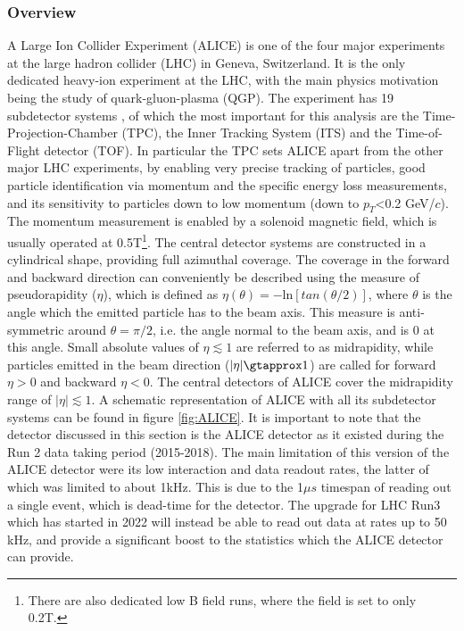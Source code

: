 \subsubsection{Overview}
A Large Ion Collider Experiment (ALICE) is one of the four major experiments at the large hadron collider (LHC) in Geneva, Switzerland. It is the only dedicated heavy-ion experiment at the LHC, with the main physics motivation being the study of quark-gluon-plasma (QGP). The experiment has 19 subdetector systems \cite{}, of which the most important for this analysis are the Time-Projection-Chamber (TPC), the Inner Tracking System (ITS) and the Time-of-Flight detector (TOF). In particular the TPC sets ALICE apart from the other major LHC experiments, by enabling very precise tracking of particles, good particle identification via momentum and the specific energy loss measurements, and its sensitivity to particles down to low momentum (down to $p_T$<0.2 GeV/$c$). The momentum measurement is enabled by a solenoid magnetic field, which is usually operated at 0.5T\footnote{There are also dedicated low B field runs, where the field is set to only 0.2T.}. The central detector systems are constructed in a cylindrical shape, providing full azimuthal coverage. The coverage in the forward and backward direction can conveniently be described using the measure of pseudorapidity ($\eta$), which is defined as $\eta (\theta) = -\mathrm{ln}[tan(\theta/2)]$, where $\theta$ is the angle which the emitted particle has to the beam axis. This measure is anti-symmetric around $\theta = \pi/2$, i.e. the angle normal to the beam axis, and is 0 at this angle. Small absolute values of $\eta \lesssim 1$ are referred to as midrapidity, while particles emitted in the beam direction ($|\eta|\gtapprox 1$) are called for forward $\eta >0$ and backward $\eta < 0$. The central detectors of ALICE cover the midrapidity range of $|\eta|\lesssim 1$. A schematic representation of ALICE with all its subdetector systems can be found in figure \ref{fig:ALICE}. It is important to note that the detector discussed in this section is the ALICE detector as it existed during the Run 2 data taking period (2015-2018). The main limitation of this version of the ALICE detector were its low interaction and data readout rates, the latter of which was limited to about 1kHz. This is due to the 1$\mu s$ timespan of reading out a single event, which is dead-time for the detector. The upgrade for LHC Run3 which has started in 2022 will instead be able to read out data at rates up to 50 kHz, and provide a significant boost to the statistics which the ALICE detector can provide.


